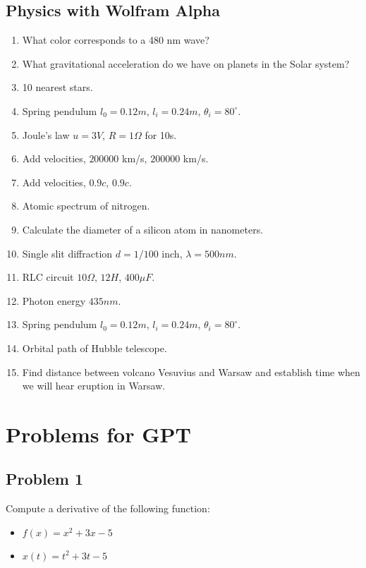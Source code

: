 \documentclass[11pt]{article}
\begin{document}
\subsection*{Physics with Wolfram Alpha}
\begin{enumerate}
    \item What color corresponds to a 480 nm wave?
    \item What gravitational acceleration do we have on planets in the Solar system?
    \item 10 nearest stars.
    \item Spring pendulum $l_0=0.12m$, $l_i=0.24m$, $\theta_i=80^\circ$.
    \item Joule's law $u=3V$, $R=1\Omega$ for 10s.
    \item Add velocities, $200000$ km/s, $200000$ km/s.
    \item Add velocities, $0.9c$, $0.9c$.
    \item Atomic spectrum of nitrogen.
    \item Calculate the diameter of a silicon atom in nanometers.
    \item Single slit diffraction $d=1/100$ inch, $\lambda=500nm$.
    \item RLC circuit $10\Omega$, $12H$, $400\mu F$.
    \item Photon energy $435nm$.
    \item Spring pendulum $l_0=0.12m$, $l_i=0.24m$, $\theta_i=80^\circ$.
    \item Orbital path of Hubble telescope.
    \item Find distance between volcano Vesuvius and Warsaw and establish time when we will hear eruption in Warsaw.
\end{enumerate}

\newpage

\section*{Problems for GPT}

\subsection*{Problem 1}

Compute a derivative of the following function:

\begin{itemize}
    \item $f(x) = x^2 + 3x - 5$
    \item $x(t) = t^2 + 3t - 5$
\end{itemize}
\end{document}

